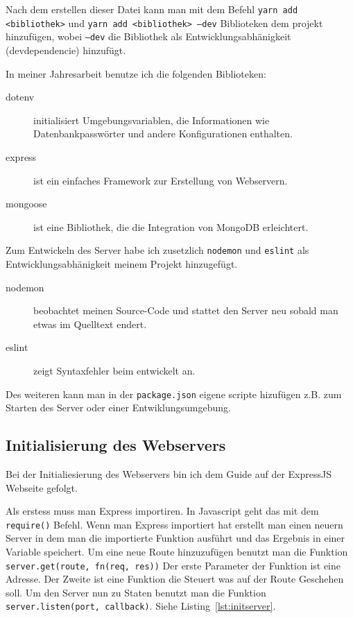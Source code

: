 \documentclass[a4paper, ngerman, 12pt]{scrartcl}
\newcommand{\js}[1]{\texttt{#1}}
\begin{document}
Nach dem erstellen dieser Datei kann man mit dem Befehl \texttt{yarn add <bibliothek>} und \texttt{yarn add <bibliothek> --dev} Biblioteken dem projekt hinzufügen, wobei \texttt{--dev} die Bibliothek als Entwicklungsabhänigkeit (devdependencie) hinzufügt.

In meiner Jahresarbeit benutze ich die folgenden Biblioteken: 

\begin{description}
	\item[dotenv] initialisiert Umgebungsvariablen, die Informationen wie Datenbankpasswörter und andere Konfigurationen enthalten.
	\item[express] ist ein einfaches Framework zur Erstellung von Webservern.
	\item[mongoose] ist eine Bibliothek, die die Integration von MongoDB erleichtert.
\end{description}

Zum Entwickeln des Server habe ich zusetzlich \texttt{nodemon} und \texttt{eslint} als Entwicklungsabhänigkeit meinem Projekt hinzugefügt.

\begin{description}
	\item[nodemon] beobachtet meinen Source-Code und stattet den Server neu sobald man etwas im Quelltext endert.
	\item[eslint] zeigt Syntaxfehler beim entwickelt an.
\end{description}

Des weiteren kann man in der \texttt{package.json} eigene scripte hizufügen z.B. zum Starten des Server oder einer Entwiklungsumgebung.

\subsection{Initialisierung des Webservers} %

Bei der Initialiesierung des Webservers bin ich dem Guide auf der ExpressJS Webseite gefolgt.

Als erstess muss man Express importiren. In Javascript geht das mit dem \js{require()} Befehl.
Wenn man Express importiert hat erstellt man einen neuern Server in dem man die importierte Funktion ausführt und das Ergebnis in einer Variable speichert.
Um eine neue Route hinzuzufügen benutzt man die Funktion \js{server.get(route, fn(req, res))}
Der erste Parameter der Funktion ist eine Adresse. Der Zweite ist eine Funktion die Steuert was auf der Route Geschehen soll.
Um den Server nun zu Staten benutzt man die Funktion \js{server.listen(port, callback)}.
Siehe Listing~\ref{lst:initserver}.
\end{document}
